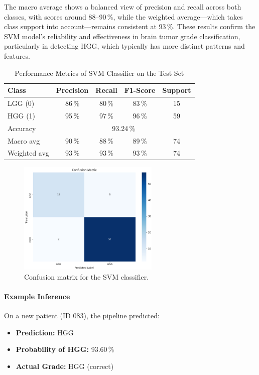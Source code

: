 The macro average shows a balanced view of precision and recall across both classes, with scores around 88–90\,\%, while the weighted average—which takes class support into account—remains consistent at 93\,\%. These results confirm the SVM model's reliability and effectiveness in brain tumor grade classification, particularly in detecting HGG, which typically has more distinct patterns and features.

\begin{table}[ht]
  \centering
  \caption{Performance Metrics of SVM Classifier on the Test Set}
  \label{tab:svm-report}
  \begin{tabular}{lcccc}
    \hline
    Class        & Precision                     & Recall & F1-Score & Support \\
    \hline
    LGG (0)      & 86\,\%                        & 80\,\% & 83\,\%   & 15      \\
    HGG (1)      & 95\,\%                        & 97\,\% & 96\,\%   & 59      \\
    \hline
    Accuracy     & \multicolumn{4}{c}{93.24\,\%}                               \\
    Macro avg    & 90\,\%                        & 88\,\% & 89\,\%   & 74      \\
    Weighted avg & 93\,\%                        & 93\,\% & 93\,\%   & 74      \\
    \hline
  \end{tabular}
\end{table}

\begin{figure}[H]
  \centering
  \includegraphics[width=0.6\textwidth]{Images/Chapter3/confusion.png}
  \caption{Confusion matrix for the SVM classifier.}
  \label{fig:confusion}
\end{figure}

\paragraph{Example Inference}
On a new patient (ID 083), the pipeline predicted:
\begin{itemize}
  \item \textbf{Prediction:} HGG
  \item \textbf{Probability of HGG:} 93.60\,\%
  \item \textbf{Actual Grade:} HGG (correct)
\end{itemize}

